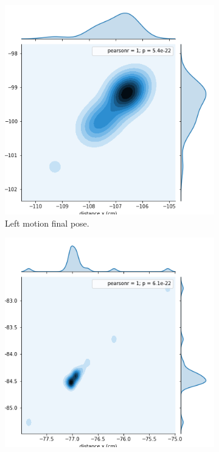 \begin{figure}[ht!]
	\centering
	\begin{subfigure}[b]{0.3\textwidth}
		\includegraphics[width=\textwidth]{images/big_left.png}
		\caption{Left motion final pose.}
		\label{distribution-right-turn}
	\end{subfigure}
	\qquad
	\begin{subfigure}[b]{0.3\textwidth}
		\includegraphics[width=\textwidth]{images/big_straight.png}

\end{subfigure}
\end{figure}
